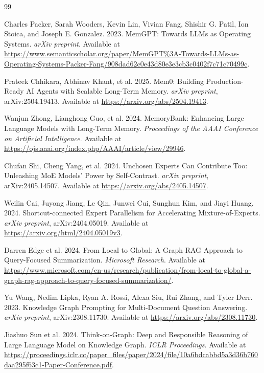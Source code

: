 \documentclass[11pt,a4paper]{article}
\begin{document}
\begin{thebibliography}{99}
\small

Charles Packer, Sarah Wooders, Kevin Lin, Vivian Fang, Shishir G. Patil, Ion Stoica, and Joseph E. Gonzalez. 2023. MemGPT: Towards LLMs as Operating Systems. \emph{arXiv preprint}. Available at \url{https://www.semanticscholar.org/paper/MemGPT%3A-Towards-LLMs-as-Operating-Systems-Packer-Fang/908dad62c0e43d80e3e3cb3c0402f7c71c70499c}.

Prateek Chhikara, Abhinav Khant, et al. 2025. Mem0: Building Production-Ready AI Agents with Scalable Long-Term Memory. \emph{arXiv preprint}, arXiv:2504.19413. Available at \url{https://arxiv.org/abs/2504.19413}.

Wanjun Zhong, Lianghong Guo, et al. 2024. MemoryBank: Enhancing Large Language Models with Long-Term Memory. \emph{Proceedings of the AAAI Conference on Artificial Intelligence}. Available at \url{https://ojs.aaai.org/index.php/AAAI/article/view/29946}.

Chufan Shi, Cheng Yang, et al. 2024. Unchosen Experts Can Contribute Too: Unleashing MoE Models' Power by Self-Contrast. \emph{arXiv preprint}, arXiv:2405.14507. Available at \url{https://arxiv.org/abs/2405.14507}.

Weilin Cai, Juyong Jiang, Le Qin, Junwei Cui, Sunghun Kim, and Jiayi Huang. 2024. Shortcut-connected Expert Parallelism for Accelerating Mixture-of-Experts. \emph{arXiv preprint}, arXiv:2404.05019. Available at \url{https://arxiv.org/html/2404.05019v3}.

Darren Edge et al. 2024. From Local to Global: A Graph RAG Approach to Query-Focused Summarization. \emph{Microsoft Research}. Available at \url{https://www.microsoft.com/en-us/research/publication/from-local-to-global-a-graph-rag-approach-to-query-focused-summarization/}.

Yu Wang, Nedim Lipka, Ryan A. Rossi, Alexa Siu, Rui Zhang, and Tyler Derr. 2023. Knowledge Graph Prompting for Multi-Document Question Answering. \emph{arXiv preprint}, arXiv:2308.11730. Available at \url{https://arxiv.org/abs/2308.11730}.

Jiashuo Sun et al. 2024. Think-on-Graph: Deep and Responsible Reasoning of Large Language Model on Knowledge Graph. \emph{ICLR Proceedings}. Available at \url{https://proceedings.iclr.cc/paper_files/paper/2024/file/10a6bdcabbd5a3d36b760daa295f63c1-Paper-Conference.pdf}.


\end{thebibliography}
\end{document}

